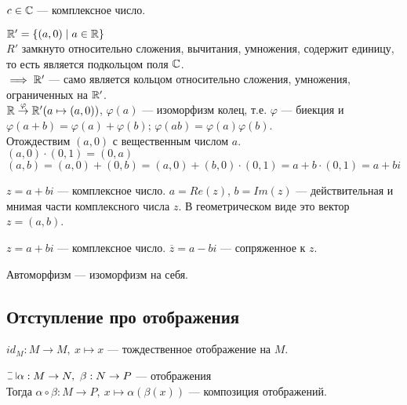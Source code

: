 \begin{normalsize}
\begin{defn}
    $c \in \mathbb{C}$ --- комплексное число.
\end{defn}

\begin{theorem-non}
    $\mathbb{R}' = \{(a, 0) \mid a \in \mathbb{R}\}$\\
    $R'$ замкнуто относительно сложения, вычитания, умножения, содержит единицу, то есть является подкольцом поля $\mathbb{C}$.\\
    $\implies \mathbb{R}'$ --- само является кольцом относительно сложения, умножения, ограниченных на $\mathbb{R}'$. \\
    $\mathbb{R} \overset{\varphi}{\to} \mathbb{R}'(a \mapsto (a, 0))$, $\varphi(a)$ --- изоморфизм колец, т.е. $\varphi$ --- биекция и $\varphi(a + b) = \varphi(a) + \varphi(b)$; $\varphi(ab) = \varphi(a)\varphi(b)$.\\
    Отождествим $(a, 0)$ с вещественным числом $a$.\\
    $(a, 0) \cdot (0, 1) = (0, a)$\\
    $(a, b) = (a, 0) + (0, b) = (a, 0) + (b, 0) \cdot (0, 1) = a + b \cdot (0, 1) = a + bi$\\
\end{theorem-non}

\begin{defn}
    $z = a + bi$ --- комплексное число.
    $a = Re(z)$, $b = Im(z)$ --- действительная и мнимая части комплексного числа $z$.
    В геометрическом виде это вектор $z = (a, b)$.
\end{defn}

\begin{defn}
    $z = a + bi$ --- комплексное число. 
    $\overline{z} = a - bi$ --- сопряженное к $z$.
\end{defn}

\begin{defn}
    Автоморфизм --- изоморфизм на себя.
\end{defn}

\subsection*{Отступление про отображения}

\begin{defn}
    $id_M: M \to M,~x \mapsto x$ --- тождественное отображение на $M$.
\end{defn}

\begin{defn}
    $\letus \alpha: M \to N,~\beta: N \to P$ --- отображения\\
    Тогда $\alpha \circ \beta: M \to P,~x \mapsto \alpha(\beta(x))$ --- композиция отображений.
\end{defn}


\end{normalsize}

